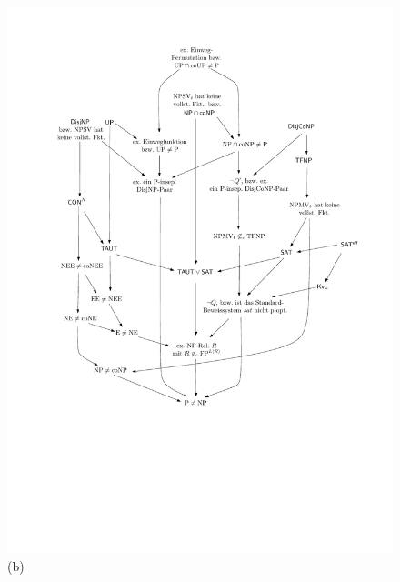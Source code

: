 \begin{figure}
    \noindent
\begin{minipage}{.3\textwidth}
    \centering\includegraphics[page=4]{figures.pdf}\\\smallskip
    (b)
    \end{minipage}
\begin{minipage}{.3\textwidth}

\end{minipage}
\end{figure}
